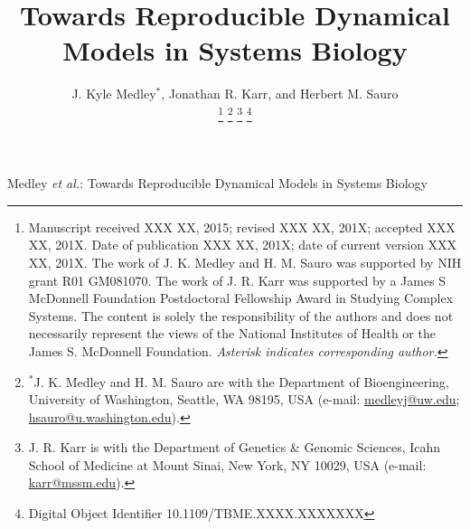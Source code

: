 \documentclass[journal,transmag,twoside]{IEEEtran}
\newcommand{\email}[1]{\href{mailto:#1}{#1}}
\begin{document}
\title{Towards Reproducible Dynamical Models in Systems Biology}

\author{
    J. Kyle Medley$^*$,
	Jonathan R. Karr, and
	Herbert M. Sauro
    
    \thanks{
        Manuscript received XXX XX, 2015; revised XXX XX, 201X; accepted XXX XX, 201X. Date of publication XXX XX, 201X; date of current version XXX XX, 201X.
        The work of J. K. Medley and H. M. Sauro was supported by NIH grant R01 GM081070. The work of J. R. Karr was supported by a James S McDonnell Foundation Postdoctoral Fellowship Award in Studying Complex Systems. The content is solely the responsibility of the authors and does not necessarily represent the views of the National Institutes of Health or the James S. McDonnell Foundation.
        \textit{Asterisk indicates corresponding author.}
    }
    \thanks{$^*$J. K. Medley and H. M. Sauro are with the Department of Bioengineering, University of Washington, Seattle, WA 98195, USA (e-mail: \email{medleyj@uw.edu}; \email{hsauro@u.washington.edu}).}
    \thanks{J. R. Karr is with the Department of Genetics \& Genomic Sciences, Icahn School of Medicine at Mount Sinai, New York, NY 10029, USA (e-mail: \email{karr@mssm.edu}).}
    \thanks{Digital Object Identifier 10.1109/TBME.XXXX.XXXXXXX}
}

%
{Medley \MakeLowercase{\textit{et al.}}: Towards Reproducible Dynamical Models in Systems Biology}
% 








\maketitle
\end{document}
